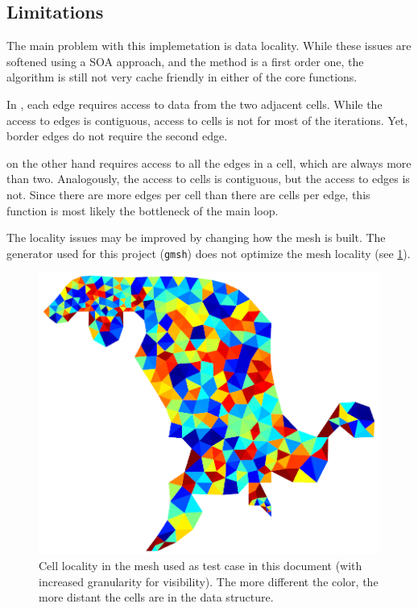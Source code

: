 \subsection{Limitations}

The main problem with this implemetation is data locality. While these issues are softened using a SOA approach, and the method is a first order one, the algorithm is still not very cache friendly in either of the core functions.

In \computeflux, each edge requires access to data from the two adjacent cells. While the access to edges is contiguous, access to cells is not for most of the iterations. Yet, border edges do not require the second edge.

\update on the other hand requires access to all the edges in a cell, which are always more than two. Analogously, the access to cells is contiguous, but the access to edges is not. Since there are more edges per cell than there are cells per edge, this function is most likely the bottleneck of the main loop.

The locality issues may be improved by changing how the mesh is built. The generator used for this project (\texttt{gmsh}) does not optimize the mesh locality (see \cref{fig:locality}).


\begin{figure}[!htp]
	\centering
	\includegraphics[width=\columnwidth]{images/locality_tiny.png}
	\caption{Cell locality in the mesh used as test case in this document (with increased granularity for visibility). The more different the color, the more distant the cells are in the data structure.}
	\label{fig:locality}
\end{figure}
